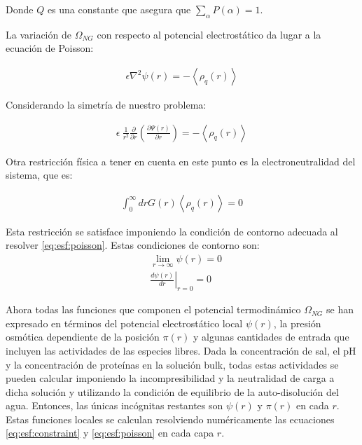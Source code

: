 \noindent Donde $Q$ es una constante que asegura que $\sum_\alpha P(\alpha) = 1$.


La variaci\'on de $\Omega_{NG}$ con respecto al potencial electrost\'atico da lugar a la ecuaci\'on de Poisson:

\begin{align}
	\epsilon\nabla^2\psi(r) = -\left<\rho_q(r)\right>
\end{align}

Considerando la simetr\'ia de nuestro problema:

\begin{align}
	\epsilon ~ \frac{1}{r^2} \frac{\partial}{\partial r}\left(\frac{\partial \Psi(r)}{\partial r}\right) = -\left<\rho_q(r)\right>
	\label{eq:esf:poisson}
\end{align}

Otra restricci\'on f\'isica a tener en cuenta en este punto es la electroneutralidad del sistema, que es:

\begin{align}
	\int_0^\infty{drG(r) \left<\rho_q(r)\right>} = 0
\end{align}

Esta restricci\'on se satisface imponiendo la condici\'on de contorno adecuada al resolver \ref{eq:esf:poisson}. Estas condiciones de contorno son:
\begin{align}
	&  \lim_{r\to\infty}\psi(r) = 0 \\
	&  \left.\frac{d\psi(r)}{dr}\right|_{r=0} = 0
	\label{eq:esf:contorno}
	\end{align}
	

Ahora todas las funciones que componen el potencial termodin\'amico $\Omega_{NG}$ se han expresado en t\'erminos del potencial electrost\'atico local $\psi(r)$, la presi\'on osm\'otica dependiente de la posici\'on $\pi(r)$ y algunas cantidades de entrada que incluyen las actividades de las especies libres.
Dada la concentraci\'on de sal, el pH y la concentraci\'on de prote\'inas en la soluci\'on bulk, todas estas actividades se pueden calcular imponiendo la incompresibilidad y la neutralidad de carga a dicha soluci\'on y utilizando la condici\'on de equilibrio de la auto-disoluci\'on del agua.
Entonces, las \'unicas inc\'ognitas restantes son $\psi(r)$ y $\pi(r)$ en cada $r$.
Estas funciones locales se calculan resolviendo num\'ericamente las ecuaciones \ref{eq:esf:constraint} y \ref{eq:esf:poisson} en cada capa $r$.
 

